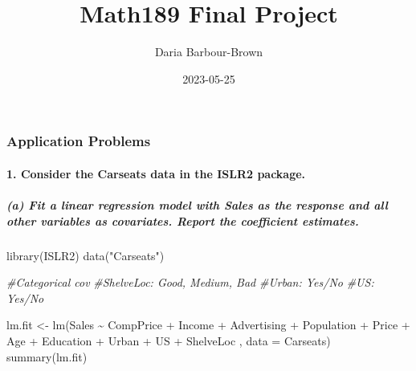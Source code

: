 \documentclass[
]{article}
\title{Math189 Final Project}
\author{Daria Barbour-Brown}
\date{2023-05-25}
\newenvironment{Shaded}{\begin{snugshade}}{\end{snugshade}}
\newcommand{\AttributeTok}[1]{\textcolor[rgb]{0.77,0.63,0.00}{#1}}
\newcommand{\CommentTok}[1]{\textcolor[rgb]{0.56,0.35,0.01}{\textit{#1}}}
\newcommand{\FunctionTok}[1]{\textcolor[rgb]{0.00,0.00,0.00}{#1}}
\newcommand{\NormalTok}[1]{#1}
\newcommand{\OtherTok}[1]{\textcolor[rgb]{0.56,0.35,0.01}{#1}}
\newcommand{\SpecialCharTok}[1]{\textcolor[rgb]{0.00,0.00,0.00}{#1}}
\newcommand{\StringTok}[1]{\textcolor[rgb]{0.31,0.60,0.02}{#1}}
\begin{document}
\maketitle

\hypertarget{application-problems}{%
\subsubsection{Application Problems}\label{application-problems}}

\hypertarget{consider-the-carseats-data-in-the-islr2-package.}{%
\paragraph{1. Consider the Carseats data in the ISLR2
package.}\label{consider-the-carseats-data-in-the-islr2-package.}}

\hypertarget{a-fit-a-linear-regression-model-with-sales-as-the-response-and-all-other-variables-as-covariates.-report-the-coefficient-estimates.}{%
\subparagraph{(a) Fit a linear regression model with Sales as the
response and all other variables as covariates. Report the coefficient
estimates.}\label{a-fit-a-linear-regression-model-with-sales-as-the-response-and-all-other-variables-as-covariates.-report-the-coefficient-estimates.}}

\begin{Shaded}
\begin{Highlighting}[]
\FunctionTok{library}\NormalTok{(ISLR2)}
\FunctionTok{data}\NormalTok{(}\StringTok{"Carseats"}\NormalTok{)}
\end{Highlighting}
\end{Shaded}

\begin{Shaded}
\begin{Highlighting}[]
\CommentTok{\#Categorical cov}
\CommentTok{\#ShelveLoc: Good, Medium, Bad}
\CommentTok{\#Urban: Yes/No }
\CommentTok{\#US: Yes/No}

\NormalTok{lm.fit }\OtherTok{\textless{}{-}} \FunctionTok{lm}\NormalTok{(Sales }\SpecialCharTok{\textasciitilde{}}\NormalTok{ CompPrice }\SpecialCharTok{+}\NormalTok{ Income }\SpecialCharTok{+}\NormalTok{ Advertising }\SpecialCharTok{+}\NormalTok{ Population }\SpecialCharTok{+}\NormalTok{ Price }\SpecialCharTok{+}\NormalTok{ Age }\SpecialCharTok{+}\NormalTok{ Education }\SpecialCharTok{+}\NormalTok{ Urban }\SpecialCharTok{+}\NormalTok{ US }\SpecialCharTok{+}\NormalTok{ ShelveLoc , }\AttributeTok{data =}\NormalTok{ Carseats)}
\FunctionTok{summary}\NormalTok{(lm.fit)}
\end{Highlighting}
\end{Shaded}
\end{document}
